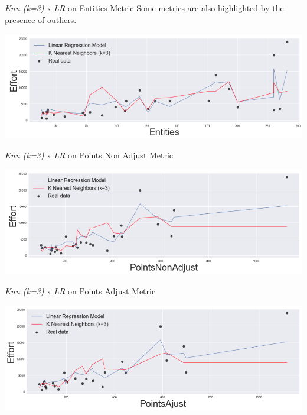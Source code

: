\documentclass{beamer}
\begin{document}
\begin{frame}{\textit{Knn (k=3)} x \textit{LR} on Entities Metric}
Some metrics are also highlighted by the presence of outliers.
	\begin{block}{}
		\begin{center}
				\includegraphics[height=4.7cm,width=4.6 in]{img/entities_plot.png}
		\end{center}
	\end{block}
\end{frame}

\begin{frame}{\textit{Knn (k=3)} x \textit{LR} on Points Non Adjust Metric}
	\begin{block}{}
		\begin{center}
				\includegraphics[height=4.7cm,width=4.6 in]{img/pointsNonAdjust_plot.png}
		\end{center}
	\end{block}
\end{frame}

\begin{frame}{\textit{Knn (k=3)} x \textit{LR} on Points Adjust Metric}
	\begin{block}{}
		\begin{center}
				\includegraphics[height=4.7cm,width=4.6 in]{img/pointsAdjust_plot.png}
		\end{center}
	\end{block}
\end{frame}
\end{document}
